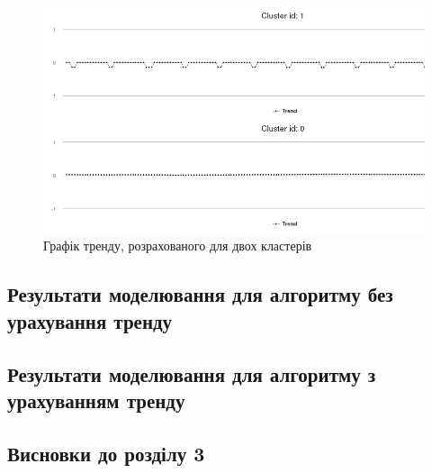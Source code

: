 \begin{figure}[h!]
        \begin{center}
            \includegraphics[scale=0.55]{resources/model_2_5.png}
        \end{center}
        \caption{Графік тренду, розрахованого для двох кластерів}
        \label{fig:model_prod_5}
\end{figure}


\subsection{Результати моделювання для алгоритму без урахування тренду}
    \TBD
\subsection{Результати моделювання для алгоритму з урахуванням тренду}
    \TBD
\newpage
\subsection*{Висновки до розділу 3}
    \TBD
